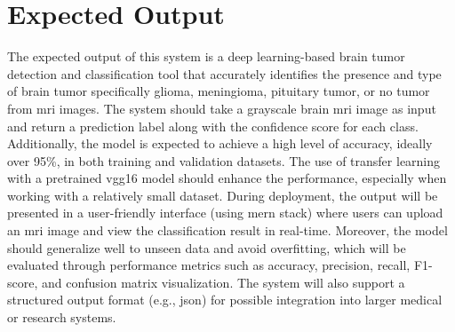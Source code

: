 \section{Expected Output}
The expected output of this system is a deep learning-based brain tumor detection and classification tool that accurately identifies the presence and type of brain tumor specifically glioma, meningioma, pituitary tumor, or no tumor from \gls{mri} images. The system should take a grayscale brain \gls{mri} image as input and return a prediction label along with the confidence score for each class. Additionally, the model is expected to achieve a high level of accuracy, ideally over 95\%, in both training and validation datasets. The use of transfer learning with a pretrained \gls{vgg16} model should enhance the performance, especially when working with a relatively small dataset. During deployment, the output will be presented in a user-friendly interface (using \gls{mern} stack) where users can upload an \gls{mri} image and view the classification result in real-time. Moreover, the model should generalize well to unseen data and avoid overfitting, which will be evaluated through performance metrics such as accuracy, precision, recall, F1-score, and confusion matrix visualization. The system will also support a structured output format (e.g., \gls{json}) for possible integration into larger medical or research systems.
